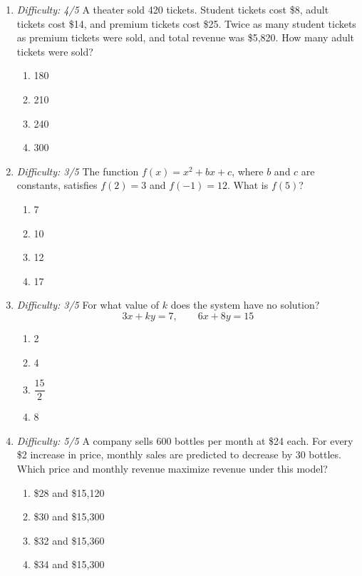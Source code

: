 \documentclass[12pt]{article}
\begin{document}
\begin{enumerate}[leftmargin=*,itemsep=1.2em,topsep=0.8em]
  \item \textit{Difficulty: 4/5} A theater sold 420 tickets. Student tickets cost \$8, adult tickets cost \$14, and premium tickets cost \$25. Twice as many student tickets as premium tickets were sold, and total revenue was \$5,820. How many adult tickets were sold?
  \begin{enumerate}[label=\Alph*.,itemsep=0pt]
    \item 180 \item 210 \item 240 \item 300
  \end{enumerate}

  \item \textit{Difficulty: 3/5} The function $f(x)=x^2+bx+c$, where $b$ and $c$ are constants, satisfies $f(2)=3$ and $f(-1)=12$. What is $f(5)$?
  \begin{enumerate}[label=\Alph*.,itemsep=0pt]
    \item 7 \item 10 \item 12 \item 17
  \end{enumerate}

  \item \textit{Difficulty: 3/5} For what value of $k$ does the system have no solution?
  \[
    3x+ky=7,\qquad 6x+8y=15
  \]
  \begin{enumerate}[label=\Alph*.,itemsep=0pt]
    \item 2 \item 4 \item $\dfrac{15}{2}$ \item 8
  \end{enumerate}

  \item \textit{Difficulty: 5/5} A company sells 600 bottles per month at \$24 each. For every \$2 increase in price, monthly sales are predicted to decrease by 30 bottles. Which price and monthly revenue maximize revenue under this model?
  \begin{enumerate}[label=\Alph*.,itemsep=0pt]
    \item \$28 and \$15,120 \item \$30 and \$15,300
    \item \$32 and \$15,360 \item \$34 and \$15,300
  \end{enumerate}


\end{enumerate}
\end{document}
